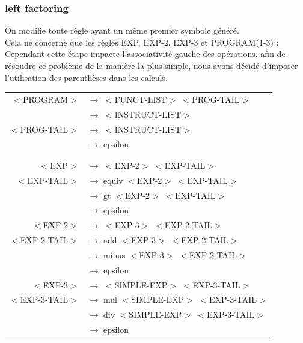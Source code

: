 \documentclass[a4paper,10pt]{article}
\begin{document}
\subsubsection{left factoring}
	On modifie toute règle ayant un même premier symbole généré.\\
	Cela ne concerne que les règles EXP, EXP-2, EXP-3 et PROGRAM(1-3) : \\
	Cependant cette étape impacte l'associativité gauche des opérations, afin de résoudre ce problème de la manière la plus simple, nous avons décidé d'imposer l'utilisation des parenthèses dans les calculs.
	\begin{center}\begin{tabular}{rl}
		$<$PROGRAM$>$		& $\rightarrow$ $<$FUNCT-LIST$>$ $<$PROG-TAIL$>$\\
							& $\rightarrow$ $<$INSTRUCT-LIST$>$\\
		$<$PROG-TAIL$>$		& $\rightarrow$ $<$INSTRUCT-LIST$>$\\
							& $\rightarrow$ epsilon\\
							&\\
							&\\
		$<$EXP$>$			& $\rightarrow$ $<$EXP-2$>$ $<$EXP-TAIL$>$ \\

		$<$EXP-TAIL$>$		& $\rightarrow$ equiv $<$EXP-2$>$ $<$EXP-TAIL$>$\\
							& $\rightarrow$ gt $<$EXP-2$>$ $<$EXP-TAIL$>$\\ 
							& $\rightarrow$ epsilon \\
					
		$<$EXP-2$>$			& $\rightarrow$ $<$EXP-3$>$ $<$EXP-2-TAIL$>$ \\

		$<$EXP-2-TAIL$>$	& $\rightarrow$ add $<$EXP-3$>$ $<$EXP-2-TAIL$>$\\
							& $\rightarrow$ minus $<$EXP-3$>$ $<$EXP-2-TAIL$>$\\ 
							& $\rightarrow$ epsilon \\
					
		$<$EXP-3$>$			& $\rightarrow$ $<$SIMPLE-EXP$>$ $<$EXP-3-TAIL$>$ \\

		$<$EXP-3-TAIL$>$	& $\rightarrow$ mul $<$SIMPLE-EXP$>$ $<$EXP-3-TAIL$>$\\
							& $\rightarrow$ div $<$SIMPLE-EXP$>$ $<$EXP-3-TAIL$>$\\ 
							& $\rightarrow$ epsilon \\				
	\end{tabular}\end{center}
\end{document}
